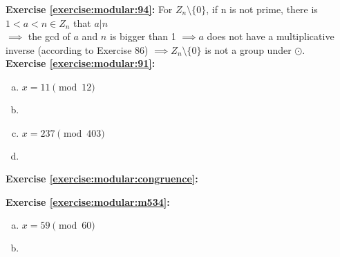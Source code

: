 \noindent\textbf{Exercise \ref{exercise:modular:94}:}
For $Z_n \setminus \{0\}$, if n is not prime, there is $1<a<n \in Z_n$ that $a|n$\\
$\implies$  the gcd of $a$ and $n$ is bigger than 1 $\implies a$ does not have a multiplicative inverse (according to Exercise 86) $\implies Z_n \setminus \{0\}$ is not a group under $\odot$.\\

\noindent\textbf{Exercise \ref{exercise:modular:91}:} 
\begin{enumerate}[(a)]
\item
$x=11 \pmod{12}$

\item

\item
$x=237 \pmod{403}$

\item
\end{enumerate}

\noindent\textbf{Exercise \ref{exercise:modular:congruence}:}

\noindent\textbf{Exercise \ref{exercise:modular:m534}:}%
\begin{enumerate}[(a)]
\item
$x=59 \pmod{60}$

\item
\end{enumerate}

